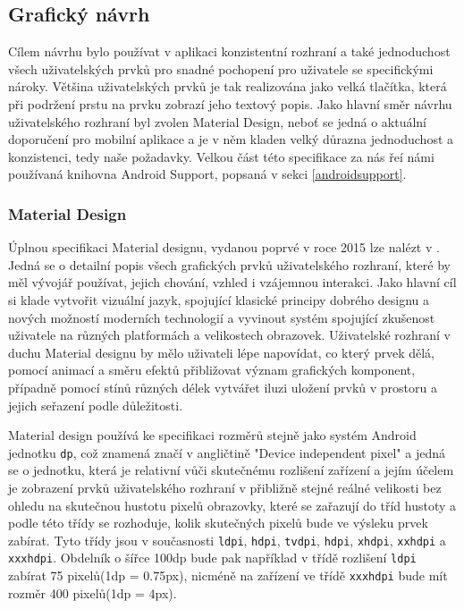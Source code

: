 \documentclass{article}
\begin{document}
\subsection{Grafický návrh}
Cílem návrhu bylo používat v aplikaci konzistentní rozhraní a také jednoduchost všech uživatelských
prvků pro snadné pochopení pro uživatele se specifickými nároky. Většina uživatelských prvků je tak
realizována jako velká tlačítka, která při podržení prstu na prvku zobrazí jeho textový popis.
Jako hlavní směr návrhu uživatelského rozhraní byl zvolen Material Design, neboť se jedná o aktuální
doporučení pro mobilní aplikace a je v něm kladen velký důrazna jednoduchost a konzistenci,
tedy naše požadavky. Velkou část této specifikace za nás řeí námi používaná knihovna Android Support,
popsaná v sekci \ref{androidsupport}.

\subsubsection{Material Design}
Úplnou specifikaci Material designu, vydanou poprvé v roce 2015 lze nalézt v \cite{materialdesign}.
Jedná se o detailní popis všech
grafických prvků uživatelského rozhraní, které by měl vývojář používat, jejich chování, vzhled i vzájemnou
 interakci. Jako hlavní cíl si klade vytvořit vizuální jazyk, spojující klasické principy dobrého designu
  a nových možností moderních technologií a vyvinout systém spojující zkušenost uživatele na různých
  platformách a velikostech obrazovek\cite{materialdesign}. Uživatelské rozhraní v duchu Material designu
  by mělo uživateli lépe napovídat, co který prvek dělá, pomocí animací a směru efektů přibližovat
  význam grafických komponent, případně pomocí stínů různých délek vytvářet iluzi uložení prvků
  v prostoru a jejich seřazení podle důležitosti.

  Material design používá ke specifikaci rozměrů
  stejně jako systém Android jednotku \texttt{dp}, což znamená značí v angličtině "Device independent
  pixel" a jedná se o jednotku, která je relativní vůči skutečnému rozlišení zařízení a jejím účelem
  je zobrazení prvků uživatelského rozhraní v přibližně stejné reálné velikosti bez ohledu na skutečnou
  hustotu pixelů obrazovky, které se zařazují do tříd hustoty a podle této třídy se rozhoduje,
  kolik skutečných pixelů bude ve výsleku prvek zabírat. Tyto třídy jsou v současnosti
  \texttt{ldpi}, \texttt{hdpi}, \texttt{tvdpi}, \texttt{hdpi}, \texttt{xhdpi}, \texttt{xxhdpi} a \texttt{xxxhdpi}.
  Obdelník o šířce 100dp bude pak například v třídě rozlišení \texttt{ldpi} zabírat 75 pixelů(1dp = 0.75px),
  nicméně na zařízení ve třídě \texttt{xxxhdpi} bude mít rozměr 400 pixelů(1dp = 4px).
\end{document}
